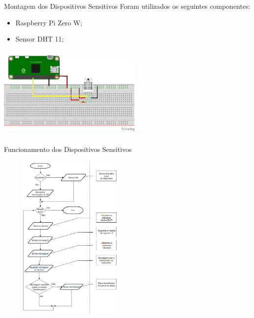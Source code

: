 \documentclass{beamer}
\begin{document}
    \begin{frame}{Montagem dos Dispositivos Sensitivos}
      \quad Foram utilizados os seguintes componentes:
      \begin{itemize}
        \item Raspberry Pi Zero W;
        \item Sensor DHT 11;
      \end{itemize}
      \begin{center}
      \includegraphics[height=130pt, width=200pt]{sensor}
      \end{center}
    \end{frame}

    \begin{frame}{Funcionamento dos Dispositivos Sensitivos}
      \begin{center}
      \includegraphics[height=235pt, width=200pt]{fluxogramaSensor}
      \end{center}
    \end{frame}
\end{document}
